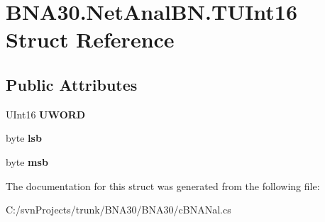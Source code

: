 \hypertarget{struct_b_n_a30_1_1_net_anal_b_n_1_1_t_u_int16}{}\section{B\+N\+A30.\+Net\+Anal\+B\+N.\+T\+U\+Int16 Struct Reference}
\label{struct_b_n_a30_1_1_net_anal_b_n_1_1_t_u_int16}
\subsection*{Public Attributes}
\begin{DoxyCompactItemize}
\item 
\mbox{\label{struct_b_n_a30_1_1_net_anal_b_n_1_1_t_u_int16_af0e05302cddba1a860c9ba050132b0e6}} 
U\+Int16 {\bfseries U\+W\+O\+RD}
\item 
\mbox{\label{struct_b_n_a30_1_1_net_anal_b_n_1_1_t_u_int16_a6c6830fa0025ab7ed9ea9324d5dcdb8c}} 
byte {\bfseries lsb}
\item 
\mbox{\label{struct_b_n_a30_1_1_net_anal_b_n_1_1_t_u_int16_ad50dea681d42bbf2f1ca154bdfb52336}} 
byte {\bfseries msb}
\end{DoxyCompactItemize}


The documentation for this struct was generated from the following file\+:\begin{DoxyCompactItemize}
\item 
C\+:/svn\+Projects/trunk/\+B\+N\+A30/\+B\+N\+A30/c\+B\+N\+A\+Nal.\+cs\end{DoxyCompactItemize}
